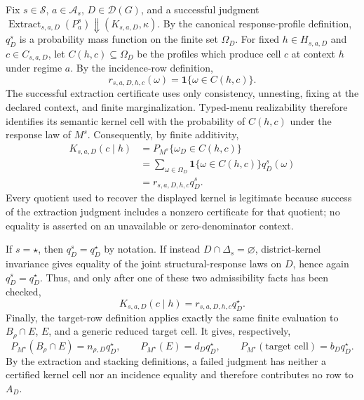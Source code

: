 Fix \(s\in\mathcal S\), \(a\in\mathcal A_s\), \(D\in\mathcal D(G)\), and a successful judgment
\(
 \operatorname{Extract}_{s,a,D}(P_a^s)\Downarrow(K_{s,a,D},\kappa).
\)
By the canonical response-profile definition, \(q_D^s\) is a probability mass function on the finite set \(\Omega_D\).  For fixed \(h\in H_{s,a,D}\) and \(c\in C_{s,a,D}\), let \(C(h,c)\subseteq\Omega_D\) be the profiles which produce cell \(c\) at context \(h\) under regime \(a\).  By the incidence-row definition,
\[
 r_{s,a,D,h,c}(\omega)=\mathbf 1\{\omega\in C(h,c)\}.
\]
The successful extraction certificate uses only consistency, unnesting, fixing at the declared context, and finite marginalization.  Typed-menu realizability therefore identifies its semantic kernel cell with the probability of \(C(h,c)\) under the response law of \(M^s\).  Consequently, by finite additivity,
\[
 \begin{aligned}
 K_{s,a,D}(c\mid h)
 &=P_{M^s}\{\omega_D\in C(h,c)\} \\
 &=\sum_{\omega\in\Omega_D}\mathbf 1\{\omega\in C(h,c)\}q_D^s(\omega) \\
 &=r_{s,a,D,h,c}q_D^s.
 \end{aligned}
\]
Every quotient used to recover the displayed kernel is legitimate because success of the extraction judgment includes a nonzero certificate for that quotient; no equality is asserted on an unavailable or zero-denominator context.

If \(s=\star\), then \(q_D^s=q_D^\star\) by notation.  If instead \(D\cap\Delta_s=\varnothing\), district-kernel invariance gives equality of the joint structural-response laws on \(D\), hence again \(q_D^s=q_D^\star\).  Thus, and only after one of these two admissibility facts has been checked,
\[
 K_{s,a,D}(c\mid h)=r_{s,a,D,h,c}q_D^\star.
\]
Finally, the target-row definition applies exactly the same finite evaluation to \(B_\rho\cap E\), \(E\), and a generic reduced target cell.  It gives, respectively,
\[
 P_{M^\star}(B_\rho\cap E)=n_{\rho,D}q_D^\star,
 \qquad P_{M^\star}(E)=d_Dq_D^\star,
 \qquad P_{M^\star}(\text{target cell})=b_Dq_D^\star.
\]
By the extraction and stacking definitions, a failed judgment has neither a certified kernel cell nor an incidence equality and therefore contributes no row to \(A_D\).